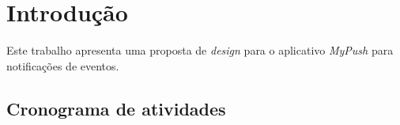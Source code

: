 \chapter[Introdução]{Introdução}

Este trabalho apresenta uma proposta de \textit{design} para o aplicativo \textit{MyPush} para notificações de eventos.

  \section{Cronograma de atividades}
  
  




